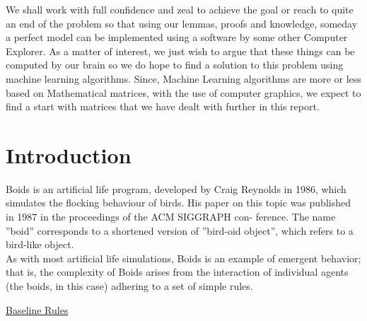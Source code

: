 \documentclass[12pt]{report}
\begin{document}
\vspace{0.2cm}
We shall work with full confidence and zeal to achieve the goal or reach to quite an end of the problem so that using our lemmas, proofs and knowledge, someday a perfect model can be implemented using a software by some other Computer Explorer. As a matter of interest, we just wish to argue that these things can be computed by our brain so we do hope to find a solution to this problem using machine learning algorithms. Since, Machine Learning algorithms are more or less based on Mathematical matrices, with the use of computer graphics, we expect to find a start with matrices that we have dealt with further in this report. 

\newpage

\tableofcontents

\newpage


\chapter{Introduction}

Boids is an artificial life program, developed by Craig Reynolds in 1986,
which simulates the flocking behaviour of birds. His paper on this topic
was published in 1987 in the proceedings of the ACM SIGGRAPH con-
ference. The name ”boid” corresponds to a shortened version of ”bird-oid
object”, which refers to a bird-like object.
\\
As with most artificial life simulations, Boids is an example of emergent
behavior; that is, the complexity of Boids arises from the interaction of individual agents (the boids, in this case) adhering to a set of simple rules.

\hyperref[sec:baseline]{Baseline Rules}

\vspace{0.5cm}
\end{document}
